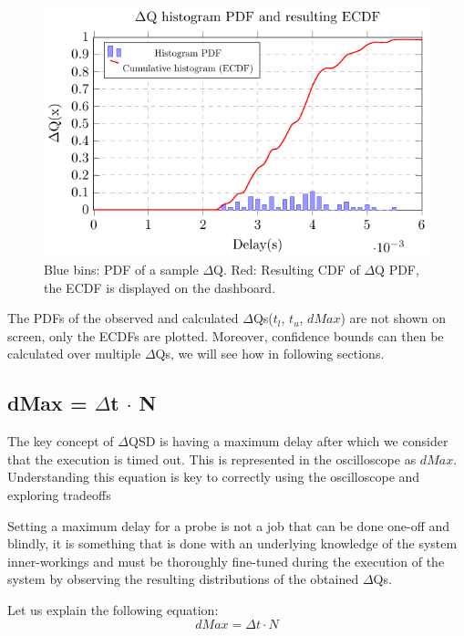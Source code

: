     \begin{figure}[H]
            \begin{center}
                \includegraphics[scale=1]{tikz/pdf_dq.pdf} 
            \end{center}
            \caption{Blue bins: PDF of a sample $\Delta$Q. Red: Resulting CDF of $\Delta$Q PDF, the ECDF is displayed on the dashboard.}
        \end{figure}
    
    The PDFs of the observed and calculated $\Delta$Qs($t_l$, $t_u$, $dMax$) are not shown on screen, only the ECDFs are plotted. Moreover, confidence bounds can then be calculated over multiple $\Delta$Qs, we will see how in following sections.

    \subsection{dMax = $\Delta$t $\cdot$ N}
        The key concept of $\Delta$QSD is having a maximum delay after which we consider that the execution is timed out. This is represented in the oscilloscope as $dMax$. Understanding this equation is key to correctly using the oscilloscope and exploring tradeoffs

Setting a maximum delay for a probe is not a job that can be done one-off and blindly, it is something that is done with an underlying knowledge of the system inner-workings and must be thoroughly fine-tuned during the execution of the system by observing the resulting distributions of the obtained $\Delta$Qs. 

Let us explain the following equation:
\begin{equation}
    dMax = \Delta t \cdot N  
    \label{eq:dMaxU}
\end{equation}

